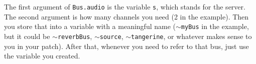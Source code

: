 The first argument of \texttt{Bus.audio} is the variable \texttt{s}, which stands for the server. The second argument is how many channels you need (2 in the example). Then you store that into a variable with a meaningful name (\texttt{$\sim$myBus} in the example, but it could be \texttt{$\sim$reverbBus}, \texttt{$\sim$source}, \texttt{$\sim$tangerine}, or whatever makes sense to you in your patch). After that, whenever you need to refer to that bus, just use the variable you created.